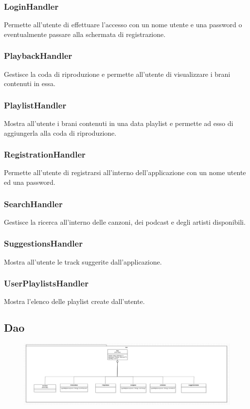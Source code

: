 \documentclass{article}
\begin{document}
\subsubsection{LoginHandler}
Permette all'utente di effettuare l'accesso con un nome utente e una password o
eventualmente passare alla schermata di registrazione.
\subsubsection{PlaybackHandler}
Gestisce la coda di riproduzione e permette all'utente di visualizzare i
brani contenuti in essa.
\subsubsection{PlaylistHandler}
Mostra all'utente i brani contenuti in una data playlist e permette ad esso di
aggiungerla alla coda di riproduzione.
\subsubsection{RegistrationHandler}
Permette all'utente di registrarsi all'interno dell'applicazione con un
nome utente ed una password.
\subsubsection{SearchHandler}
Gestisce la ricerca all'interno delle canzoni, dei podcast e degli artisti disponibili.
\subsubsection{SuggestionsHandler}
Mostra all'utente le track suggerite dall'applicazione.
\subsubsection{UserPlaylistsHandler}
Mostra l'elenco delle playlist create dall'utente.

\subsection{Dao}

\begin{figure}[H]
\includegraphics[scale=0.3]{dao01}
\end{figure}
\end{document}
